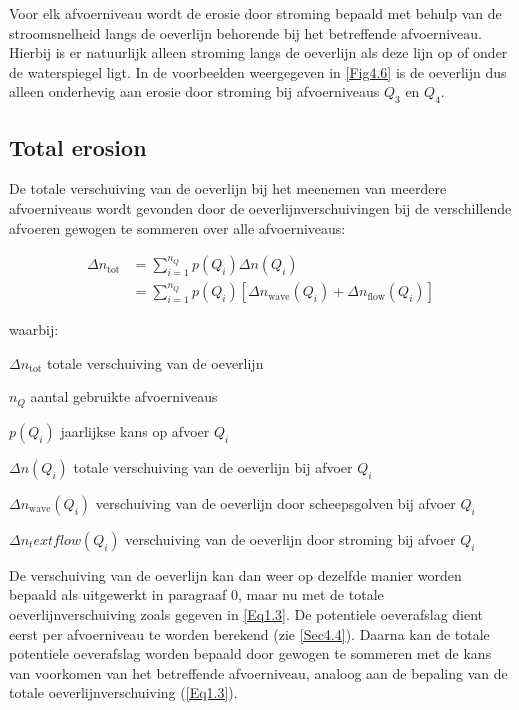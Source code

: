 Voor elk afvoerniveau wordt de erosie door stroming bepaald met behulp van de stroomsnelheid langs de oeverlijn behorende bij het betreffende afvoerniveau.
Hierbij is er natuurlijk alleen stroming langs de oeverlijn als deze lijn op of onder de waterspiegel ligt.
In de voorbeelden weergegeven in \autoref{Fig4.6} is de oeverlijn dus alleen onderhevig aan erosie door stroming bij afvoerniveaus $Q_3$ en $Q_4$.

\subsection{Total erosion}

De totale verschuiving van de oeverlijn bij het meenemen van meerdere afvoerniveaus wordt gevonden door de oeverlijnverschuivingen bij de verschillende afvoeren gewogen te sommeren over alle afvoerniveaus:

\begin{align}
\Delta n_\text{tot} &= \sum_{i=1}^{n_Q} p(Q_i) \Delta n(Q_i) \\
                    &= \sum_{i=1}^{n_Q} p(Q_i) \left [ \Delta n_\text{wave}(Q_i) + \Delta n_\text{flow}(Q_i) \right ]
\label{Eq1.3}
\end{align}

waarbij:

\begin{symbollist}
\item[$\Delta n_\text{tot}$]  totale verschuiving van de oeverlijn 
\item[$n_Q$] aantal gebruikte afvoerniveaus \unitbrackets{-}
\item[$p(Q_i)$] jaarlijkse kans op afvoer $Q_i$ \unitbrackets{-}
\item[$\Delta n(Q_i)$] totale verschuiving van de oeverlijn bij afvoer $Q_i$ 
\item[$\Delta n_\text{wave}(Q_i)$] verschuiving van de oeverlijn door scheepsgolven bij afvoer $Q_i$ 
\item[$\Delta n_text{flow}(Q_i)$] verschuiving van de oeverlijn door stroming bij afvoer $Q_i$ 
\end{symbollist}

De verschuiving van de oeverlijn kan dan weer op dezelfde manier worden bepaald als uitgewerkt in paragraaf 0, maar nu met de totale oeverlijnverschuiving zoals gegeven in \autoref{Eq1.3}.
De potentiele oeverafslag dient eerst per afvoerniveau te worden berekend (zie \autoref{Sec4.4}).
Daarna kan de totale potentiele oeverafslag worden bepaald door gewogen te sommeren met de kans van voorkomen van het betreffende afvoerniveau, analoog aan de bepaling van de totale oeverlijnverschuiving (\autoref{Eq1.3}).

